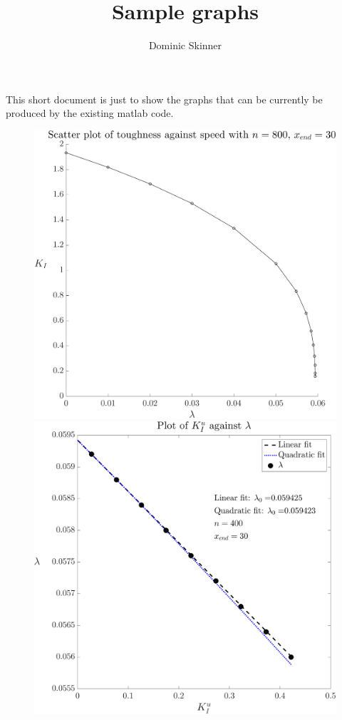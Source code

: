 \documentclass{article}
\begin{document}
\title{Sample graphs}
\author{Dominic Skinner}
\maketitle
This short document is just to show the graphs that can be
currently be produced by the existing matlab code. 
\begin{figure}[ht]\centering
\includegraphics[scale=0.36]{K-lambda.pdf}
\includegraphics[scale=0.38]{l0.pdf}
\end{figure}
\end{document}

